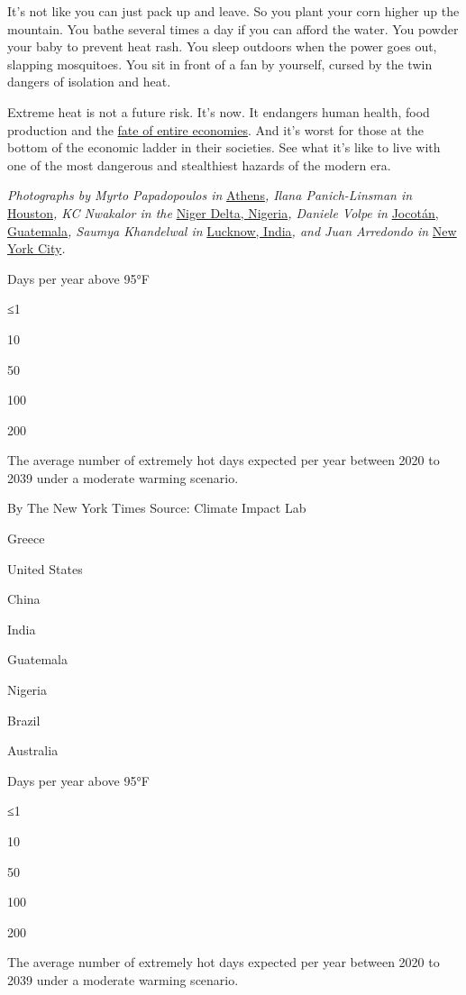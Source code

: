 It's not like you can just pack up and leave. So you plant your corn
higher up the mountain. You bathe several times a day if you can afford
the water. You powder your baby to prevent heat rash. You sleep outdoors
when the power goes out, slapping mosquitoes. You sit in front of a fan
by yourself, cursed by the twin dangers of isolation and heat.

Extreme heat is not a future risk. It's now. It endangers human health,
food production and the \href{https://www.nber.org/papers/w27599}{fate
of entire economies}. And it's worst for those at the bottom of the
economic ladder in their societies. See what it's like to live with one
of the most dangerous and stealthiest hazards of the modern era.

\emph{Photographs by Myrto Papadopoulos in}
\protect\hyperlink{greece}{Athens}\emph{, Ilana Panich-Linsman in}
\protect\hyperlink{houston}{Houston}\emph{, KC Nwakalor in the}
\protect\hyperlink{nigeria}{Niger Delta, Nigeria}\emph{, Daniele Volpe
in} \protect\hyperlink{guatemala}{Jocotán, Guatemala}\emph{, Saumya
Khandelwal in} \protect\hyperlink{india}{Lucknow, India}\emph{, and Juan
Arredondo in} \protect\hyperlink{newyork}{New York City}\emph{.}

Days per year above 95°F

≤1

10

50

100

200

The average number of extremely hot days expected per year between 2020
to 2039 under a moderate warming scenario.

By The New York Times \textbar{} Source: Climate Impact Lab

Greece

United States

China

India

Guatemala

Nigeria

Brazil

Australia

Days per year above 95°F

≤1

10

50

100

200

The average number of extremely hot days expected per year between 2020
to 2039 under a moderate warming scenario.

